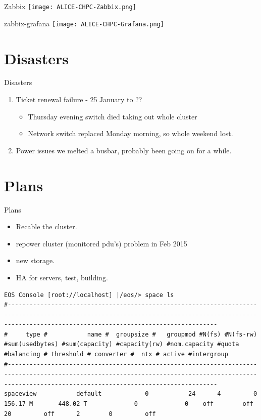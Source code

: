 \documentclass[10pt]{beamer}
\begin{document}
\begin{frame}{Zabbix}
    \texttt{[image: ALICE-CHPC-Zabbix.png]}
\end{frame}
\begin{frame}{zabbix-grafana}
    \texttt{[image: ALICE-CHPC-Grafana.png]} 
\end{frame}


\section{Disasters}
\begin{frame}{Disasters}
\begin{enumerate}
  \item Ticket renewal failure  - 25 January to ?? %
      \begin{itemize}
      \item Thursday evening switch died taking out whole cluster
      \item Network switch replaced Monday morning, so whole weekend lost.
    \end{itemize}
  \item Power issues we melted a busbar, probably been going on for a while. %

\end{enumerate}
\end{frame}
\section{Plans}

\begin{frame}[fragile]{Plans}
  \begin{itemize}
    \item Recable the cluster.
    \item repower cluster (monitored pdu's) problem in Feb 2015
    \item new storage.
    \item HA for servers, test, building. %
  \end{itemize}
  {\tiny
\begin{verbatim}
EOS Console [root://localhost] |/eos/> space ls
#------------------------------------------------------------------------------------------------------------------------------------------------------------------------------------------------------
#     type #           name #  groupsize #   groupmod #N(fs) #N(fs-rw) #sum(usedbytes) #sum(capacity) #capacity(rw) #nom.capacity #quota #balancing # threshold # converter #  ntx # active #intergroup
#------------------------------------------------------------------------------------------------------------------------------------------------------------------------------------------------------
spaceview           default            0           24      4         0        156.17 M       448.02 T             0             0    off        off          20         off      2        0         off
\end{verbatim}
}
\end{frame}
\end{document}
